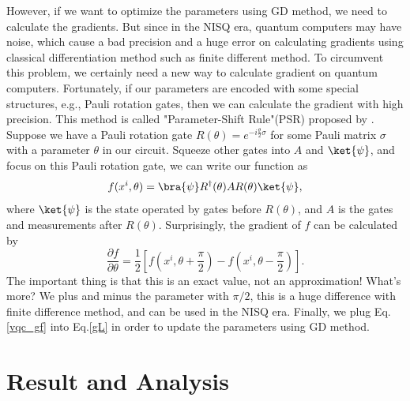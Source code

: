 \documentclass{article}
\begin{document}
However, if we want to optimize the parameters using GD method, we need to calculate the gradients. But since in the NISQ era, quantum computers may have noise, which cause a bad precision and a huge error on calculating gradients using classical differentiation method such as finite different method. To circumvent this problem, we certainly need a new way to calculate gradient on quantum computers. Fortunately, if our parameters are encoded with some special structures, e.g., Pauli rotation gates, then we can calculate the gradient with high precision. This method is called "Parameter-Shift Rule"(PSR) proposed by \citet{1905.13311}. Suppose we have a Pauli rotation gate $R(\theta)=e^{-i\frac{\theta}{2}\sigma}$ for some Pauli matrix $\sigma$ with a parameter $\theta$ in our circuit. Squeeze other gates into $A$ and $\ket{\psi}$, and
focus on this Pauli rotation gate, we can write our function as
\begin{equation} \label{vqc_f}
    f(x^i,\theta)=\bra{\psi}R^\dagger(\theta)AR(\theta)\ket{\psi},
\end{equation}
where $\ket{\psi}$ is the state operated by gates before $R(\theta)$, and $A$ is the gates and measurements after $R(\theta)$. Surprisingly, the gradient of $f$ can be calculated by
\begin{equation} \label{vqc_gf}
    \frac{\partial f}{\partial \theta}=\frac{1}{2}[f(x^i, \theta+\frac{\pi}{2})-f(x^i, \theta-\frac{\pi}{2})].
\end{equation}
The important thing is that this is an exact value, not an approximation! What's more? We plus and minus the parameter with $\pi/2$, this is a huge difference with finite difference method, and can be used in the NISQ era. Finally, we plug Eq.\ref{vqc_gf} into Eq.\ref{gL} in order to update the parameters using GD method.

\section{Result and Analysis}
\end{document}
